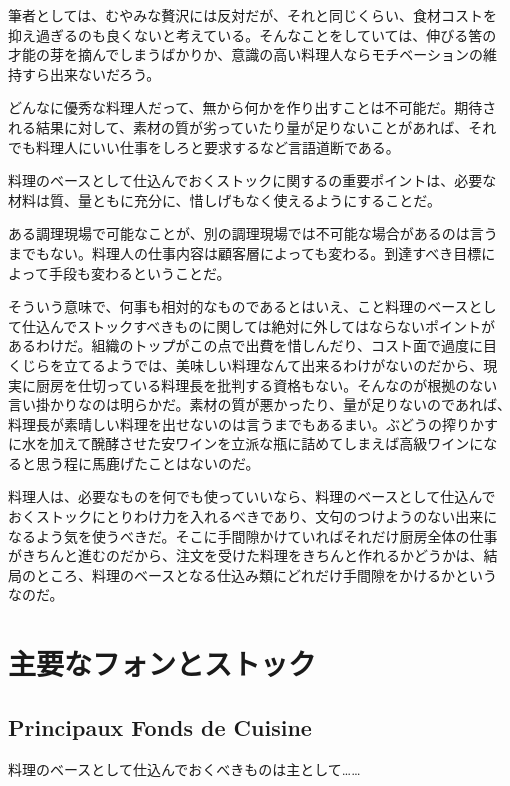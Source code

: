 \documentclass[twoside,12Q,b5j]{escoffierltjsbook}
\begin{document}
筆者としては、むやみな贅沢には反対だが、それと同じくらい、食材コストを
抑え過ぎるのも良くないと考えている。そんなことをしていては、伸びる筈の
才能の芽を摘んでしまうばかりか、意識の高い料理人ならモチベーションの維
持すら出来ないだろう。

どんなに優秀な料理人だって、無から何かを作り出すことは不可能だ。期待さ
れる結果に対して、素材の質が劣っていたり量が足りないことがあれば、それ
でも料理人にいい仕事をしろと要求するなど言語道断である。

料理のベースとして仕込んでおくストックに関するの重要ポイントは、必要な
材料は質、量ともに充分に、惜しげもなく使えるようにすることだ。

ある調理現場で可能なことが、別の調理現場では不可能な場合があるのは言う
までもない。料理人の仕事内容は顧客層によっても変わる。到達すべき目標に
よって手段も変わるということだ。

そういう意味で、何事も相対的なものであるとはいえ、こと料理のベースとし
て仕込んでストックすべきものに関しては絶対に外してはならないポイントが
あるわけだ。組織のトップがこの点で出費を惜しんだり、コスト面で過度に目
くじらを立てるようでは、美味しい料理なんて出来るわけがないのだから、現
実に厨房を仕切っている料理長を批判する資格もない。そんなのが根拠のない
言い掛かりなのは明らかだ。素材の質が悪かったり、量が足りないのであれば、
料理長が素晴しい料理を出せないのは言うまでもあるまい。ぶどうの搾りかす
に水を加えて醗酵させた安ワインを立派な瓶に詰めてしまえば高級ワインにな
ると思う程に馬鹿げたことはないのだ。

料理人は、必要なものを何でも使っていいなら、料理のベースとして仕込んで
おくストックにとりわけ力を入れるべきであり、文句のつけようのない出来に
なるよう気を使うべきだ。そこに手間隙かけていればそれだけ厨房全体の仕事
がきちんと進むのだから、注文を受けた料理をきちんと作れるかどうかは、結
局のところ、料理のベースとなる仕込み類にどれだけ手間隙をかけるかという
なのだ。

\section{主要なフォンとストック}\label{ux4e3bux8981ux306aux30d5ux30a9ux30f3ux3068ux30b9ux30c8ux30c3ux30af}

\subsection{Principaux Fonds de
Cuisine}\label{principaux-fonds-de-cuisine}

料理のベースとして仕込んでおくべきものは主として\ldots{}\ldots{}
\end{document}
